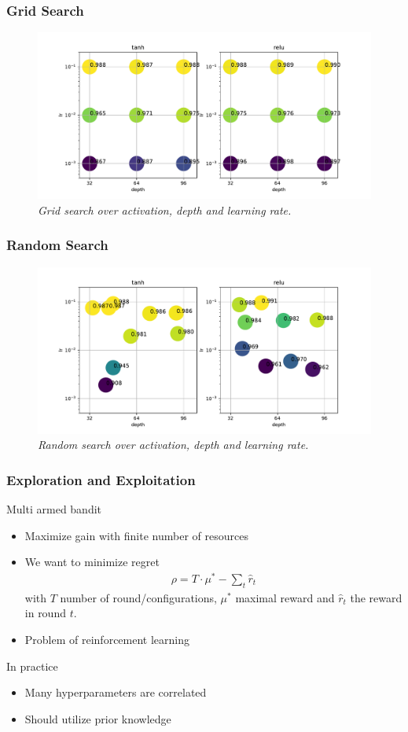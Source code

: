 \documentclass{beamer}
\newcommand{\bi}{\begin{itemize}}
\newcommand{\ei}{\end{itemize}}
\begin{document}
\begin{frame}
\frametitle{Grid Search}
\begin{figure}[t]
	\centering
	\includegraphics[scale=0.45]{grid_search.pdf}
	\caption{\it Grid search over activation, depth and learning rate.}
	\label{fig:grid}
\end{figure}
\end{frame}


\begin{frame}
\frametitle{Random Search}
\begin{figure}[t]
	\centering
	\includegraphics[scale=0.45]{random_search.pdf}
	\caption{\it Random search over activation, depth and learning rate.}
	\label{fig:random}
\end{figure}
\end{frame}

\begin{frame}
\frametitle{Exploration and Exploitation}
Multi armed bandit
\bi
\item Maximize gain with finite number of resources
\item We want to minimize regret
\begin{align}
	\rho = T \cdot \mu^* - \sum_t \hat{r}_t
\end{align}
with $T$ number of round/configurations, $\mu^*$ maximal reward and $\hat{r}_t$ the reward in round $t$.
\item Problem of reinforcement learning
\ei
\pause 
In practice
\bi
\item Many hyperparameters are correlated
\item Should utilize prior knowledge
\ei
\end{frame}
\end{document}
